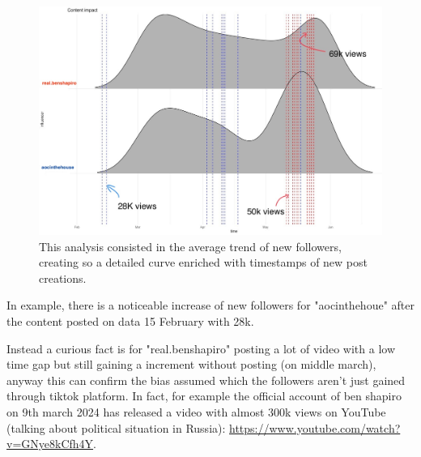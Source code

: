 \begin{figure}[H]
    \centering
    \includegraphics[width = .48\textwidth]{images/Final_ContentImpact_Custom.jpg}
    \caption*{This analysis consisted in the average trend of new followers, creating so a detailed curve enriched with timestamps of new post creations.}
\end{figure}

In example, there is a noticeable increase of new followers for "aocinthehoue" after the content posted on data 15 February with 28k.

Instead a curious fact is for "real.benshapiro" posting a lot of video with a low time gap but still gaining a increment without posting (on middle march), anyway this can confirm the bias assumed which the followers aren't just gained through tiktok platform. In fact, for example the official account of ben shapiro on 9th march 2024 has released a video with almost 300k views on YouTube (talking about political situation in Russia): \url{https://www.youtube.com/watch?v=GNye8kCfh4Y}.